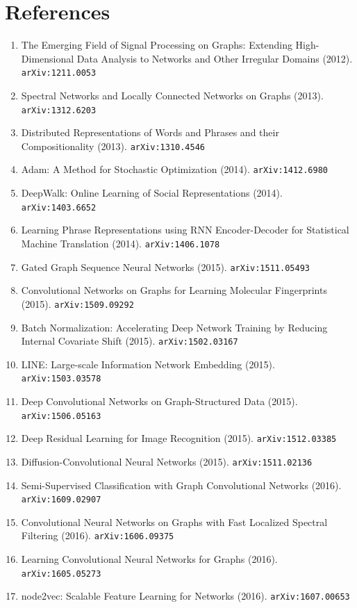 \documentclass[11pt]{article}
\begin{document}
\section*{References}
\begin{enumerate}\small
  \item The Emerging Field of Signal Processing on Graphs: Extending
  High-Dimensional Data Analysis to Networks and Other Irregular Domains (2012). \texttt{arXiv:1211.0053}
  \item Spectral Networks and Locally Connected Networks on Graphs (2013). \texttt{arXiv:1312.6203}
  \item Distributed Representations of Words and Phrases and their
  Compositionality (2013). \texttt{arXiv:1310.4546}
  \item Adam: A Method for Stochastic Optimization (2014). \texttt{arXiv:1412.6980}
  \item DeepWalk: Online Learning of Social Representations (2014). \texttt{arXiv:1403.6652}
  \item Learning Phrase Representations using RNN Encoder-Decoder for
  Statistical Machine Translation (2014). \texttt{arXiv:1406.1078}
  \item Gated Graph Sequence Neural Networks (2015). \texttt{arXiv:1511.05493}
  \item Convolutional Networks on Graphs for Learning Molecular Fingerprints (2015). \texttt{arXiv:1509.09292}
  \item Batch Normalization: Accelerating Deep Network Training by Reducing
  Internal Covariate Shift (2015). \texttt{arXiv:1502.03167}
  \item LINE: Large-scale Information Network Embedding (2015). \texttt{arXiv:1503.03578}
  \item Deep Convolutional Networks on Graph-Structured Data (2015). \texttt{arXiv:1506.05163}
  \item Deep Residual Learning for Image Recognition (2015). \texttt{arXiv:1512.03385}
  \item Diffusion-Convolutional Neural Networks (2015). \texttt{arXiv:1511.02136}
  \item Semi-Supervised Classification with Graph Convolutional Networks (2016). \texttt{arXiv:1609.02907}
  \item Convolutional Neural Networks on Graphs with Fast Localized Spectral
  Filtering (2016). \texttt{arXiv:1606.09375}
  \item Learning Convolutional Neural Networks for Graphs (2016). \texttt{arXiv:1605.05273}
  \item node2vec: Scalable Feature Learning for Networks (2016). \texttt{arXiv:1607.00653}

\end{enumerate}
\end{document}
